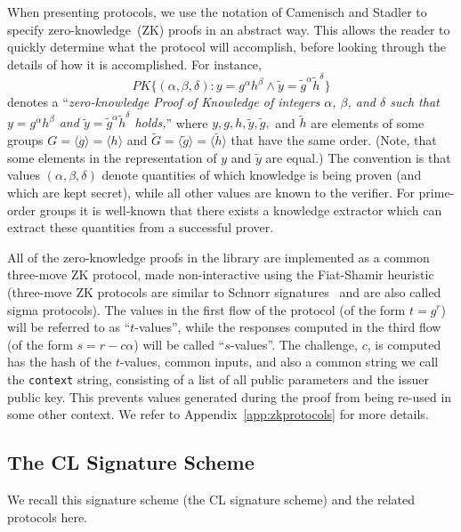 When presenting protocols, we use the notation of Camenisch and Stadler \cite{camsta97b} to
specify zero-knowledge~(ZK) proofs in an abstract way. 
This allows the reader to quickly determine what the protocol will accomplish, before looking
through the details of how it is accomplished. 
For instance,
\[
  \mathit{PK}\{(\alpha,\beta,\delta): y=g^{\alpha}h^{\beta} \wedge
    \tilde{y}=\tilde{g}^{\alpha}\tilde{h}^{\delta}\}
\]
denotes a ``{\em zero-knowledge Proof of Knowledge of integers $\alpha$, $\beta$, and 
$\delta$ such that $y=g^{\alpha}h^{\beta}$ and $\tilde{y} = 
\tilde{g}^{\alpha}\tilde{h}^{\delta}$ holds,}'' where $y,g,h,\tilde{y},\tilde{g},$ and
$\tilde{h}$ are elements of some groups $G=\langle g\rangle=\langle h\rangle$ and 
$\tilde{G}=\langle\tilde{g}\rangle=\langle\tilde{h}\rangle$ that have the same order.
(Note, that some elements in the representation of $y$ and $\tilde{y}$ are
equal.) 
The convention is that values $(\alpha,\beta,\delta)$ denote quantities of which knowledge 
is being proven (and which are kept secret), while all other values are known to the
verifier.  
For prime-order groups%
it is well-known
that there exists a knowledge extractor which can extract these quantities from a successful
prover.

\label{section:context}
All of the zero-knowledge proofs in the \idemix library are implemented as a common
three-move ZK protocol, made non-interactive using the Fiat-Shamir heuristic~\cite{fiasha86}
(three-move ZK protocols are similar to Schnorr signatures~\cite{schnor91} and are also 
called sigma protocols).  
The values in the first flow of the protocol (of the form $t=g^r$) will be referred to as
``$t$-values'', while the responses computed in the third flow (of the form
$s=r-c\alpha$) will be called ``$s$-values''.  
The challenge, $c$, is computed has the hash of the $t$-values, common inputs, and also a
common string we call the {\tt context} string, consisting of a list of all public 
parameters and the issuer public key.  
This prevents values generated during the proof from being re-used in some other context.
%
We refer to Appendix~\ref{app:zkprotocols} for more details.


\subsection{The CL Signature Scheme}

We recall this signature scheme (the CL signature scheme) and the related protocols here.

